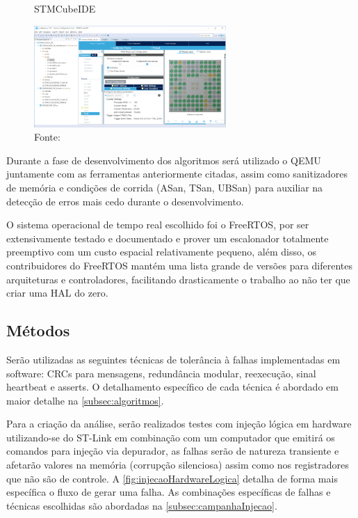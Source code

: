 \begin{figure}[H]
    \centering
    \captionsetup{justification=centering}
    \caption{STMCubeIDE}
    \includegraphics[width=0.65\textwidth]{assets/stmcube_ide.png}
    \captionsetup{justification=raggedright}
    \caption*{Fonte: }
    \label{fig:stmCubeIDE}
\end{figure}

Durante a fase de desenvolvimento dos algoritmos será utilizado o QEMU juntamente com as ferramentas anteriormente citadas, assim como sanitizadores de memória e condições de corrida (ASan, TSan, UBSan) para auxiliar na detecção de erros mais cedo durante o desenvolvimento.

O sistema operacional de tempo real escolhido foi o FreeRTOS, por ser extensivamente testado e documentado e prover um escalonador totalmente preemptivo com um custo espacial relativamente pequeno, além disso, os contribuidores do FreeRTOS mantém uma lista grande de versões para diferentes arquiteturas e controladores, facilitando drasticamente o trabalho ao não ter que criar uma HAL do zero.

\subsection{Métodos}

Serão utilizadas as seguintes técnicas de tolerância à falhas implementadas em software: CRCs para mensagens, redundância modular, reexecução, sinal heartbeat e asserts. O detalhamento específico de cada técnica é abordado em maior detalhe na \autoref{subsec:algoritmos}.

Para a criação da análise, serão realizados testes com injeção lógica em hardware utilizando-se do ST-Link em combinação com um computador que emitirá os comandos para injeção via depurador, as falhas serão de natureza transiente e afetarão valores na memória (corrupção silenciosa) assim como nos registradores que não são de controle. A \autoref{fig:injecaoHardwareLogica} detalha de forma mais específica o fluxo de gerar uma falha. As combinações específicas de falhas e técnicas escolhidas são abordadas na \autoref{subsec:campanhaInjecao}.

